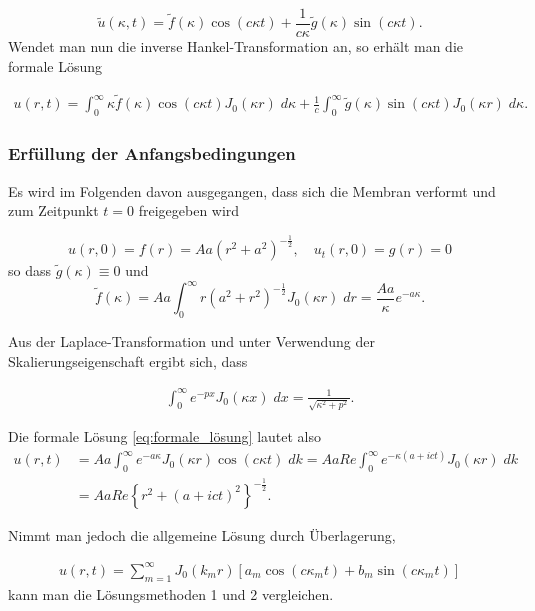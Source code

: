 \begin{equation*}
	\tilde{u}(\kappa,t)=\tilde{f}(\kappa)\cos(c\kappa t) + \frac{1}{c\kappa}\tilde{g}(\kappa)\sin(c\kappa t).
\end{equation*}
Wendet man nun die inverse Hankel-Transformation an, so erhält man die formale Lösung

\begin{align}
	u(r,t)=\int_{0}^{\infty}\kappa\tilde{f}(\kappa)\cos(c\kappa t) J_0(\kappa r) \; d\kappa +\frac{1}{c}\int_{0}^{\infty}\tilde{g}(\kappa)\sin(c\kappa t)J_0(\kappa r) \; d\kappa.
	\label{eq:formale_lösung}
\end{align}

\subsubsection{Erfüllung der Anfangsbedingungen\label{subsub:erfüllung_AB}}
Es wird im Folgenden davon ausgegangen, dass sich die Membran verformt und zum Zeitpunkt $t=0$ freigegeben wird

\begin{equation*}
	u(r,0)=f(r)=Aa(r^2 + a^2)^{-\frac{1}{2}}, \quad u_t(r,0)=g(r)=0
\end{equation*}
so dass $\tilde{g}(\kappa)\equiv 0$ und
\begin{equation*}
	\tilde{f}(\kappa)=Aa\int_{0}^{\infty}r(a^2 + r^2)^{-\frac{1}{2}} J_0 (\kappa r) \; dr=\frac{Aa}{\kappa}e^{-a\kappa}.
\end{equation*}

Aus der Laplace-Transformation und unter Verwendung der Skalierungseigenschaft ergibt sich, dass

\begin{align*}
	\int_{0}^{\infty}e^{-px} J_0(\kappa x) \; dx = \frac{1}{\sqrt{\kappa^2 + p^2}}.
\end{align*}	

Die formale Lösung  \eqref{eq:formale_lösung} lautet also
\begin{align*}
	u(r,t)&=Aa\int_{0}^{\infty}e^{-a\kappa} J_0(\kappa r)\cos(c\kappa t) \; dk=AaRe\int_{0}^{\infty}e^{-\kappa(a+ict)} J_0(\kappa r) \; dk\\
	&=AaRe\left\{r^2+\left(a+ict\right)^2\right\}^{-\frac{1}{2}}.
\end{align*}

Nimmt man jedoch die allgemeine Lösung durch Überlagerung, 

\begin{align}
	u(r, t) = \displaystyle\sum_{m=1}^{\infty} J_0 (k_{m}r)[a_{m}\cos(c \kappa_{m} t)+b_{m}\sin(c \kappa_{m} t)]
	\label{eq:lösung_unendliche_generelle}
\end{align}
kann man die Lösungsmethoden 1 und 2 vergleichen.

